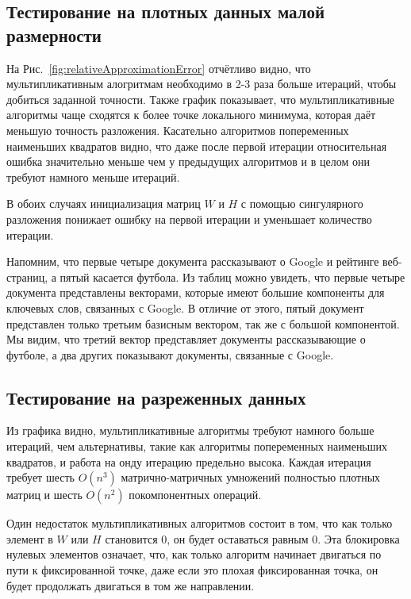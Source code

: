 \subsection{Тестирование на плотных данных малой размерности}

На Рис.~\ref{fig:relativeApproximationError} отчётливо видно,
что мультипликативным алогритмам необходимо в 2-3 раза больше итераций, чтобы добиться заданной точности.
Также график показывает, что мультипликативные алгоритмы чаще сходятся к более  точке локального минимума,
которая даёт меньшую точность разложения.
Касательно алгоритмов попеременных наименьших квадратов видно, что даже после первой итерации
относительная ошибка значительно меньше чем у предыдущих алгоритмов и в целом они требуют намного меньше итераций.

В обоих случаях инициализация матриц $W$ и $H$ с помощью сингулярного разложения понижает ошибку на первой итерации и уменьшает количество итерации.

Напомним, что первые четыре документа рассказывают о Google и рейтинге веб-страниц,
а пятый касается футбола. Из таблиц можно увидеть, что первые четыре документа представлены векторами,
которые имеют большие компоненты для ключевых слов, связанных с Google.
В отличие от этого, пятый документ представлен только третьим базисным вектором, так же с большой компонентой.
Мы видим, что третий вектор представляет документы рассказывающие о футболе, а два других показывают документы, связанные с Google.


\newpage


\subsection{Тестирование на разреженных данных}

Из графика видно, мультипликативные алгоритмы требуют намного больше итераций, чем альтернативы,
такие как алгоритмы попеременных наименьших квадратов, и работа на онду итерацию предельно высока.
Каждая итерация требует шесть $O(n^3)$ матрично-матричных умножений полностью плотных матриц и шесть
$O (n^2)$ покомпонентных операций.

Один недостаток мультипликативных алгоритмов состоит в том, что как только элемент в $W$ или $H$ становится 0,
он будет оставаться равным 0. Эта блокировка нулевых элементов означает, что,
как только алгоритм начинает двигаться по пути к фиксированной точке,
даже если это плохая фиксированная точка, он будет продолжать двигаться в том же направлении.

